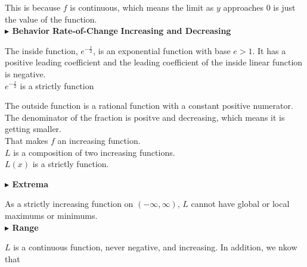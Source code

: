 \documentclass{ximera}
\begin{document}
\begin{example}
This is because $f$ is continuous, which means the limit as $y$ approaches $0$ is just the value of the function. \\












\textbf{\textcolor{blue!55!black}{$\blacktriangleright$ Behavior}} 
\textbf{Rate-of-Change}  
\textbf{Increasing and Decreasing}   



The inside function, $e^{-\tfrac{x}{2}}$, is an exponential function with base $e > 1$.  It has a positive leading coefficient and the leading coefficient of the inside linear function is negative. \\


$e^{-\tfrac{x}{2}}$ is a strictly   function 


The outside function is a rational function with a constant positive numerator. \\

The denominator of the fraction is positve and decreasing, which means it is getting smaller. \\

That makes $f$ an increasing function. \\


$L$ is a composition of two increasing functions. \\


$L(x)$ is a strictly   function.






\textbf{\textcolor{blue!55!black}{$\blacktriangleright$ Extrema}} 


As a strictly increasing function on $(-\infty, \infty)$, $L$ cannot have global or local maximums or minimums. \\










\textbf{\textcolor{blue!55!black}{$\blacktriangleright$ Range}} 



$L$ is a continuous function, never negative, and increasing. In addition, we nkow that 






\end{example}
\end{document}

